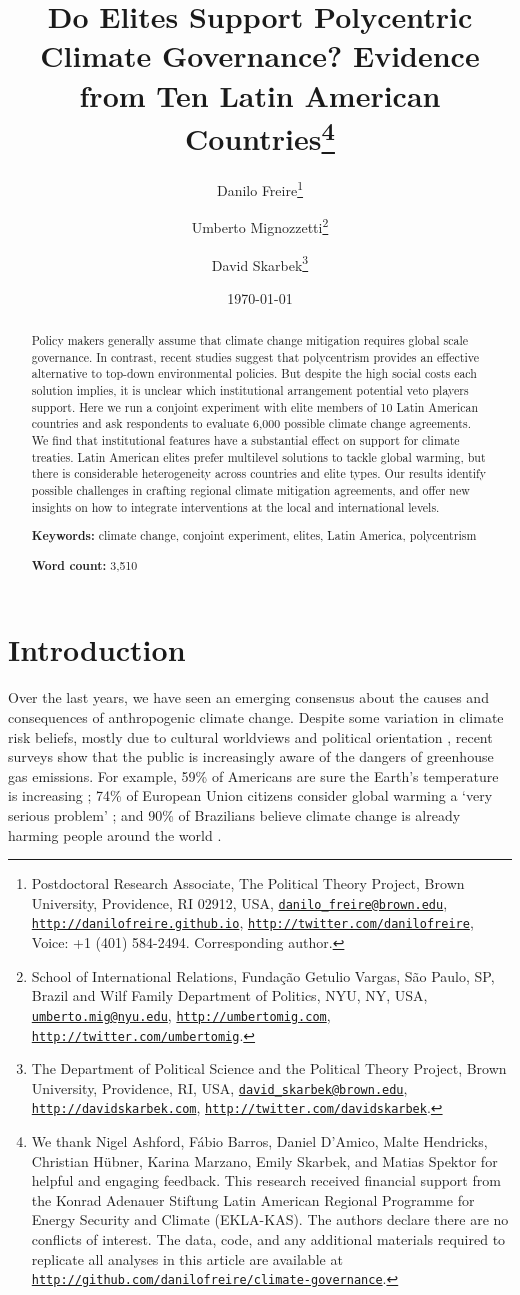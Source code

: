 \documentclass[a4paper,12pt]{article}
\title{Do Elites Support Polycentric Climate Governance? Evidence from Ten Latin American Countries\thanks{We thank Nigel Ashford, F\'{a}bio Barros, Daniel D'Amico, Malte Hendricks, Christian H\"{u}bner, Karina Marzano, Emily Skarbek, and Matias Spektor for helpful and engaging feedback. This research received financial support from the Konrad Adenauer Stiftung Latin American Regional Programme for Energy Security and Climate (EKLA-KAS). The authors declare there are no conflicts of interest. The data, code, and any additional materials required to replicate all analyses in this article are available at \href{http://github.com/danilofreire/climate-governance}{\texttt{http://github.com/danilofreire/climate-governance}}.}}
\author{Danilo Freire\thanks{Postdoctoral Research Associate, The Political Theory Project, Brown University, Providence, RI 02912, USA, \href{mailto:danilo_freire@brown.edu}{\texttt{danilo\_freire@brown.edu}}, \href{http://danilofreire.github.io}{\texttt{http://danilofreire.github.io}}, \href{http://twitter.com/danilofreire}{\texttt{http://twitter.com/danilofreire}}, Voice: +1 (401) 584-2494. Corresponding author.} 
\and Umberto Mignozzetti\thanks{School of International Relations, Funda\c{c}\~{a}o Getulio Vargas, S\~{a}o Paulo, SP, Brazil and Wilf Family Department of Politics, NYU, NY, USA, \href{mailto:umberto.mig@nyu.edu}{\texttt{umberto.mig@nyu.edu}}, \href{http://umbertomig.com}{\texttt{http://umbertomig.com}}, \href{http://twitter.com/umbertomig}{\texttt{http://twitter.com/umbertomig}}.} \and David Skarbek\thanks{The Department of Political Science and the Political Theory Project, Brown University, Providence, RI, USA, \href{mailto:david_skarbek@brown.edu}{\texttt{david\_skarbek@brown.edu}}, \href{http://davidskarbek.com}{\texttt{http://davidskarbek.com}}, \href{http://twitter.com/davidskarbek}{\texttt{http://twitter.com/davidskarbek}}.}
}
\date{\today}
\begin{document}
\maketitle

\begin{abstract}
\onehalfspacing
\noindent
Policy makers generally assume that climate change mitigation requires global scale governance. In contrast, recent studies suggest that polycentrism provides an effective alternative to top-down environmental policies. But despite the high social costs each solution implies, it is unclear which institutional arrangement potential veto players support. Here we run a conjoint experiment with elite members of 10 Latin American countries and ask respondents to evaluate 6,000 possible climate change agreements. We find that institutional features have a substantial effect on support for climate treaties. Latin American elites prefer multilevel solutions to tackle global warming, but there is considerable heterogeneity across countries and elite types. Our results identify possible challenges in crafting regional climate mitigation agreements, and offer new insights on how to integrate interventions at the local and international levels.

\vspace{.5cm}

\noindent 
\textbf{Keywords:} climate change, conjoint experiment, elites, Latin America, polycentrism

\vspace{.5cm}

\noindent 
\textbf{Word count:} 3,510
\end{abstract}

\newpage

\doublespacing

\section{Introduction}%
\label{sec:introduction}

Over the last years, we have seen an emerging consensus about the causes and consequences of anthropogenic climate change. Despite some variation in climate risk beliefs, mostly due to cultural worldviews and political orientation \citep{hornsey2016meta}, recent surveys show that the public is increasingly aware of the dangers of greenhouse gas emissions. For example, 59\% of Americans are sure the Earth's temperature is increasing \citep{stanfordearth2018}; 74\% of European Union citizens consider global warming a `very serious problem' \citep{europe2018survey}; and 90\% of Brazilians believe climate change is already harming people around the world \citep{pew2018climate}.
\end{document}

